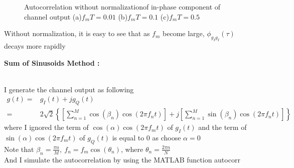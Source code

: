 \documentclass{article}
\begin{document}
\begin{flushleft}
\begin{enumerate}
\newpage
\begin{figure}[H]
\centering
{}
\caption{Autocorrelation without normalizationof in-phase component of channel output (a)$f_mT=0.01$ (b)$f_mT=0.1$ (c)$f_mT=0.5$}
\end{figure}
Without normalization, it is easy to see that as $f_m$ become large,  $\phi_{g_Ig_I}(\tau)$ decays more rapidly

\newpage
{\Large \item  \bf Sum of Sinusoids Method : }\\
I generate the channel output as following\\
$\begin{aligned}
g(t)=&g_I(t)+jg_Q(t)\\
=&2\sqrt{2}\left\{\left[\sum\limits_{n=1}^M \cos(\beta_n)\cos(2\pi f_nt) \right]+j\left[\sum\limits_{n=1}^M \sin(\beta_n)\cos(2\pi f_nt) \right] \right\}
\end{aligned}$
where I ignored the term of $\cos(\alpha)\cos(2\pi f_mt)$ of $g_I(t)$ and the term of $\sin(\alpha)\cos(2\pi f_mt)$ of $g_Q(t)$ is equal to 0 as choose $\alpha=0$\\
Note that $\beta_n=\frac{\pi n}{M},\ f_n=f_m\cos(\theta_n)$, where $ \theta_n=\frac{2\pi n}{N}$\\
And I simulate the autocorrelation by using the MATLAB function autocorr


\end{enumerate}
\end{flushleft}
\end{document}
